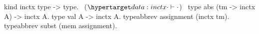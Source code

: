 \begin{elpicode}
  kind inctx type -> type.                              ~($\customlabel{data:inctx}{\cdot\vdash\cdot}$)~
  type abs (tm -> inctx A) -> inctx A.
  type val A -> inctx A.
  typeabbrev assignment (inctx tm).
  typeabbrev subst (mem assignment).
\end{elpicode}
